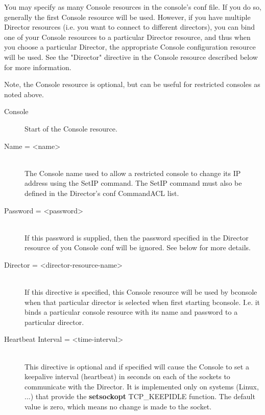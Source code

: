 You may specify as many Console resources in the console's conf file. If
you do so, generally the first Console resource will be used.  However, if
you have multiple Director resources (i.e. you want to connect to different
directors), you can bind one of your Console resources to a particular
Director resource, and thus when you choose a particular Director, the
appropriate Console configuration resource will be used. See the "Director"
directive in the Console resource described below for more information.

Note, the Console resource is optional, but can be useful for
restricted consoles as noted above.

\begin{description}
\item [Console]
Start of the Console resource.

\item [Name = {\textless}name{\textgreater}] \hfill \\
The Console name used to allow a restricted console to change
its IP address using the SetIP command. The SetIP command must
also be defined in the Director's conf CommandACL list.

\item [Password = {\textless}password{\textgreater}] \hfill \\
If this password is supplied, then the password specified in the
Director resource of you Console conf will be ignored.  See below
for more details.

\item [Director = {\textless}director-resource-name{\textgreater}] \hfill \\
If this directive is specified, this Console resource will be
used by bconsole when that particular director is selected
when first starting bconsole.  I.e. it binds a particular console
resource with its name and password to a particular director.

\item [Heartbeat Interval = {\textless}time-interval{\textgreater}] \hfill \\
This directive is optional and if specified will cause the Console to
set a keepalive interval (heartbeat) in seconds on each of the sockets
to communicate with the Director.  It is implemented only on systems
(Linux, ...) that provide the {\bf setsockopt} TCP\_KEEPIDLE function.
The default value is zero, which means no change is made to the socket.
\end{description}


